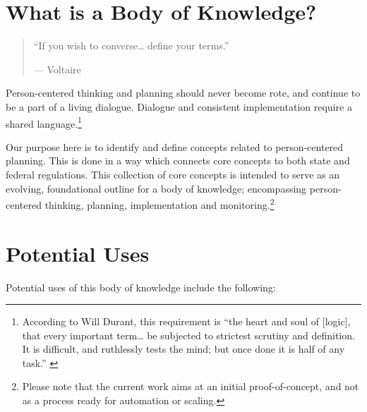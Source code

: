 \documentclass[
]{book}
\begin{document}
\hypertarget{what-is-a-body-of-knowledge}{%
\section{What is a Body of Knowledge?}\label{what-is-a-body-of-knowledge}}

\begin{quote}
``If you wish to converse\ldots{} define your terms.''

--- Voltaire
\end{quote}

Person-centered thinking and planning should never become rote, and continue to be a part of a living dialogue. Dialogue and consistent implementation require a shared language.\footnote{According to Will Durant, this requirement is ``the heart and soul of {[}logic{]}, that every important term\ldots{} be subjected to strictest scrutiny and definition. It is difficult, and ruthlessly tests the mind; but once done it is half of any task.'' \citet{durant}}

Our purpose here is to identify and define concepts related to person-centered planning. This is done in a way which connects core concepts to both state and federal regulations. This collection of core concepts is intended to serve as an evolving, foundational outline for a body of knowledge; encompassing person-centered thinking, planning, implementation and monitoring.\footnote{Please note that the current work aims at an initial proof-of-concept, and not as a process ready for automation or scaling.}

\hypertarget{potential-uses}{%
\section{Potential Uses}\label{potential-uses}}

Potential uses of this body of knowledge include the following:
\end{document}
